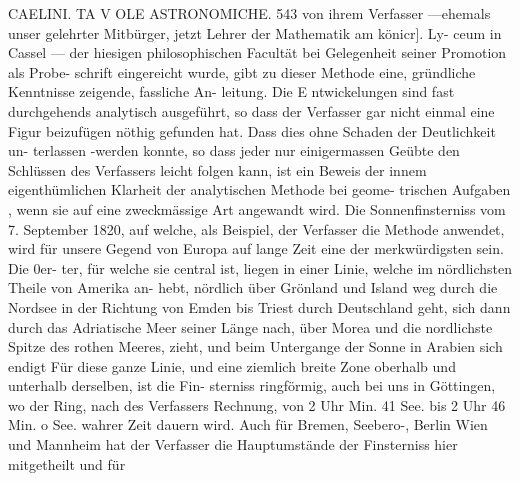 \documentclass[12pt,a4paper]{article}
\begin{document}
\newpage
CAELINI. TA V OLE ASTRONOMICHE. 543\newline
von ihrem Verfasser ---ehemals unser gelehrter Mitbürger, jetzt Lehrer der Mathematik am könicr]. Ly-\newline
ceum in Cassel --- der hiesigen philosophischen Facultät bei Gelegenheit seiner Promotion als Probe-\newline
schrift eingereicht wurde, gibt zu dieser Methode eine, gründliche Kenntnisse zeigende, fassliche An-\newline
leitung. Die E ntwickelungen sind fast durchgehends analytisch ausgeführt, so dass der Verfasser gar\newline
nicht einmal eine Figur beizufügen nöthig gefunden hat. Dass dies ohne Schaden der Deutlichkeit un-\newline
terlassen -werden konnte, so dass jeder nur einigermassen Geübte den Schlüssen des Verfassers leicht\newline
folgen kann, ist ein Beweis der innem eigenthümlichen Klarheit der analytischen Methode bei geome-\newline
trischen Aufgaben , wenn sie auf eine zweckmässige Art angewandt wird.\newline
Die Sonnenfinsterniss vom 7. September 1820, auf welche, als Beispiel, der Verfasser die Methode\newline
anwendet, wird für unsere Gegend von Europa auf lange Zeit eine der merkwürdigsten sein. Die 0er-\newline
ter, für welche sie central ist, liegen in einer Linie, welche im nördlichsten Theile von Amerika an-\newline
hebt, nördlich über Grönland und Island weg durch die Nordsee in der Richtung von Emden bis Triest\newline
durch Deutschland geht, sich dann durch das Adriatische Meer seiner Länge nach, über Morea und die\newline
nordlichste Spitze des rothen Meeres, zieht, und beim Untergange der Sonne in Arabien sich endigt\newline
Für diese ganze Linie, und eine ziemlich breite Zone oberhalb und unterhalb derselben, ist die Fin-\newline
sterniss ringförmig, auch bei uns in Göttingen, wo der Ring, nach des Verfassers Rechnung, von 2 Uhr Min. 41 See. bis 2 Uhr 46 Min. o See. wahrer Zeit dauern wird. Auch für Bremen, Seebero-, Berlin\newline
Wien und Mannheim hat der Verfasser die Hauptumstände der Finsterniss hier mitgetheilt und für\newline
\end{document}
